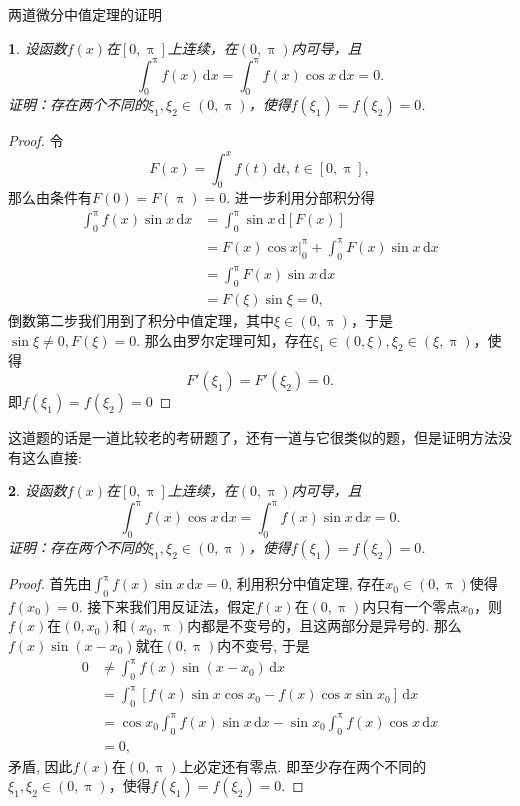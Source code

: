 \documentclass[UTF8,no-math,12pt,openany,table,dvipsnames,svgnames]{book}
\renewcommand{\pi}{\uppi}
\newtheorem{example}{}
\begin{document}
\begin{MYBOX}[colbacktitle=blue]{两道微分中值定理的证明}
  \setcounter{example}{0}
  \begin{example}
    设函数$f(x)$在$[0,\pi]$上连续，在$(0,\pi)$内可导，且
    \[
      \int_0^\pi f(x)\,\mathrm dx =
      \int_0^\pi f(x)\cos x\,\mathrm dx = 0.
    \]
    证明：存在两个不同的$\xi_1,\xi_2\in(0,\pi)$，使得$f(\xi_1)=f(\xi_2)=0$.
  \end{example}
  \begin{proof}
    令
    \[
      F(x) = \int_0^x f(t)\,\mathrm dt,\,t\in[0,\pi],
    \]
    那么由条件有$F(0)=F(\pi)=0$. 进一步利用分部积分得
    \begin{align*}
      \int_0^\pi f(x)\sin x\,\mathrm dx & = \int_0^\pi\sin x\,\mathrm d[F(x)]\\
      & = F(x)\cos x\big|_0^\pi + \int_0^\pi F(x)\sin x\,\mathrm dx\\
      & = \int_0^\pi F(x) \sin x\,\mathrm dx\\
      & = F(\xi)\sin \xi = 0,
    \end{align*}
    倒数第二步我们用到了积分中值定理，其中$\xi\in(0,\pi)$，于是$\sin \xi \ne0,F(\xi)=0$. 那么由罗尔定理可知，存在$\xi_1\in(0,\xi),\xi_2\in(\xi,\pi)$，使得
    \[ F'(\xi_1) = F'(\xi_2) = 0. \]
    即$f(\xi_1)=f(\xi_2)=0$
  \end{proof}
  这道题的话是一道比较老的考研题了，还有一道与它很类似的题，但是证明方法没有这么直接:
  \begin{example}
    设函数$f(x)$在$[0,\pi]$上连续，在$(0,\pi)$内可导，且
    \[
      \int_0^\pi f(x)\cos x\,\mathrm dx =
      \int_0^\pi f(x)\sin x\,\mathrm dx = 0.
    \]
    证明：存在两个不同的$\xi_1,\xi_2\in(0,\pi)$，使得$f(\xi_1)=f(\xi_2)=0$.
  \end{example}
  \begin{proof}
    首先由$\int_0^\pi f(x)\sin x\,\mathrm dx=0$, 利用积分中值定理, 存在$x_0\in(0,\pi)$使得$f(x_0)=0$. 接下来我们用反证法，假定$f(x)$在$(0,\pi)$内只有一个零点$x_0$，则$f(x)$在$(0,x_0)$和$(x_0,\pi)$内都是不变号的，且这两部分是异号的. 那么$f(x)\sin(x-x_0)$就在$(0,\pi)$内不变号, 于是
    \begin{align*}
      0 & \ne \int_0^\pi f(x)\sin(x-x_0)\,\mathrm dx\\
        & = \int_0^\pi[f(x)\sin x\cos x_0 - f(x)\cos x\sin x_0]\,\mathrm dx\\
        & = \cos x_0\int_0^\pi f(x)\sin x\,\mathrm dx - \sin x_0\int_0^\pi f(x)\cos x\,\mathrm dx\\
        & = 0,
    \end{align*}
    矛盾, 因此$f(x)$在$(0,\pi)$上必定还有零点. 即至少存在两个不同的$\xi_1,\xi_2\in(0,\pi)$，使得$f(\xi_1)=f(\xi_2)=0$.
  \end{proof}
\end{MYBOX}
\end{document}
